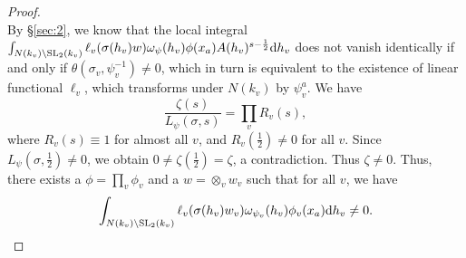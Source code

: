 \begin{proof}
\[\]
By \S \ref{sec:2}, we know that the local integral $\int_{N(k_v) \backslash \mathrm{SL}_2(k_v)} \ell_v(\sigma(h_v)w) \omega_\psi(h_v)\phi(x_a) A(h_v)^{s -\frac{1}{2}} \mathrm{d} h_v$ does not vanish identically if and only if $\theta(\sigma_v, \psi_v^{-1}) \neq 0$, which in turn is equivalent to the existence of linear functional $\ell_v$, which transforms under $N(k_v)$ by $\psi_v^a$.
We have
\[
\frac{\zeta(s)}{L_\psi(\sigma, s)} = \prod_v R_v(s),
\]
where $R_v(s) \equiv 1$ for almost all $v$, and $R_v(\frac{1}{2}) \neq 0$ for all $v$.
Since $L_\psi(\sigma, \frac{1}{2}) \neq 0$, we obtain $0 \neq \zeta(\frac{1}{2}) = \zeta$, a contradiction.
Thus $\zeta \neq 0$.
Thus, there exists a $\phi = \prod_v \phi_v$ and a $w = \otimes_v w_v$ such that for all $v$, we have
\[
\int_{N(k_v) \backslash \mathrm{SL}_2(k_v)}  \ell_v(\sigma(h_v) w_v) \omega_{\psi_v}(h_v) \phi_v(x_a) \mathrm{d} h_v \neq 0.
\]
\end{proof}

